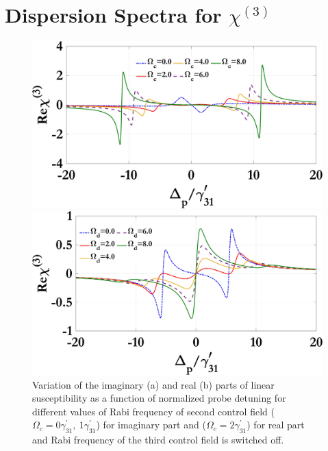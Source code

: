 \documentclass[12pt,a4paper]{article}
\begin{document}
\section{Dispersion Spectra for \(\chi^{(3)}\) }

\begin{figure}[h]
  \centering
  \begin{minipage}{0.48\textwidth}
    \centering
    \includegraphics[width=\linewidth]{Plots/Real_chi3_Omega_c.jpeg}
    \subcaption{}
  \end{minipage}%
  \hfill
  \begin{minipage}{0.48\textwidth}
    \centering
    \includegraphics[width=\linewidth]{Plots/Real_chi3_Omega_d.jpeg}
    \subcaption{}
  \end{minipage}
  \caption{Variation of the imaginary (a) and real (b) parts of linear susceptibility as a function of normalized probe detuning for different values of Rabi frequency of second control field ($\Omega_c=0\gamma^{\prime}_{31},\ 1\gamma^{\prime}_{31}$) for imaginary part and ($\Omega_c=2\gamma^{\prime}_{31}$) for real part and Rabi frequency of the third control field is switched off.}
  \label{fig:omegac}
\end{figure}
\end{document}

